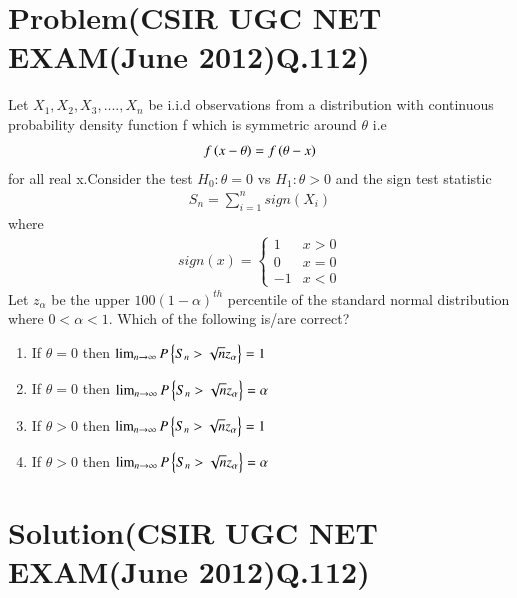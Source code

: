 \documentclass[journal,12pt,twocolumn]{IEEEtran}
\begin{document}
\section{Problem(CSIR UGC NET EXAM(June 2012)Q.112)}
Let $X_1,X_2,X_3,....,X_n$ be i.i.d observations from a distribution with continuous probability density function f which is symmetric around $\theta$ i.e
\begin{align}
    f\left(x-\theta\right)=f\left(\theta -x\right)
\end{align}
for all real x.Consider the test $H_0: \theta =0$ vs $H_1:  \theta >0$ and the sign test statistic
\begin{align}
    S_n = \sum_{i=1}^{n} sign(X_i)
\end{align}
where
\begin{align}
    sign(x) =
    \begin{cases}
    1  & x>0\\
    0  & x=0\\
    -1 & x<0
    \end{cases}
\end{align}
Let $z_\alpha$ be the upper $100(1-\alpha)^{th}$ percentile of the standard normal distribution where $0<\alpha <1$. Which of the following is/are correct?
\begin{enumerate}
    \item If $\theta =0$ then $ \lim_{n\to\infty} P\left\{S_n > \sqrt{n}z_{\alpha}\right\} =1 $\\
    \item If $\theta =0$ then $ \lim_{n\to\infty} P\left\{S_n > \sqrt{n}z_{\alpha}\right\} =\alpha $\\
    \item If $\theta >0$ then $ \lim_{n\to\infty} P\left\{S_n > \sqrt{n}z_{\alpha}\right\} = 1 $\\
    \item If $\theta >0$ then $ \lim_{n\to\infty} P\left\{S_n > \sqrt{n}z_{\alpha}\right\} =\alpha $
\end{enumerate}
\section{Solution(CSIR UGC NET EXAM(June 2012)Q.112)}
\end{document}
